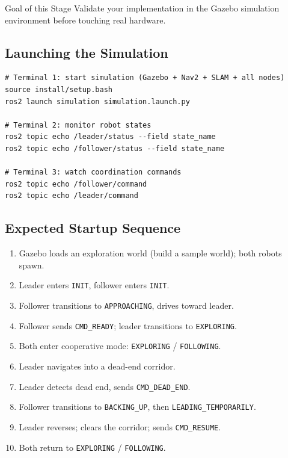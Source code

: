 \documentclass[11pt, a4paper]{article}
\begin{document}
\begin{infobox}{Goal of this Stage}
Validate your implementation in the Gazebo simulation environment before
touching real hardware.
\end{infobox}

\subsection{Launching the Simulation}

\begin{lstlisting}[style=shellcode]
# Terminal 1: start simulation (Gazebo + Nav2 + SLAM + all nodes)
source install/setup.bash
ros2 launch simulation simulation.launch.py

# Terminal 2: monitor robot states
ros2 topic echo /leader/status --field state_name
ros2 topic echo /follower/status --field state_name

# Terminal 3: watch coordination commands
ros2 topic echo /follower/command
ros2 topic echo /leader/command
\end{lstlisting}

\subsection{Expected Startup Sequence}

\begin{enumerate}
  \item Gazebo loads an exploration world (build a sample world); both robots spawn.
  \item Leader enters \texttt{INIT}, follower enters \texttt{INIT}.
  \item Follower transitions to \texttt{APPROACHING}, drives toward leader.
  \item Follower sends \texttt{CMD\_READY}; leader transitions to \texttt{EXPLORING}.
  \item Both enter cooperative mode: \texttt{EXPLORING} / \texttt{FOLLOWING}.
  \item Leader navigates into a dead-end corridor.
  \item Leader detects dead end, sends \texttt{CMD\_DEAD\_END}.
  \item Follower transitions to \texttt{BACKING\_UP}, then \texttt{LEADING\_TEMPORARILY}.
  \item Leader reverses; clears the corridor; sends \texttt{CMD\_RESUME}.
  \item Both return to \texttt{EXPLORING} / \texttt{FOLLOWING}.
\end{enumerate}
\end{document}
